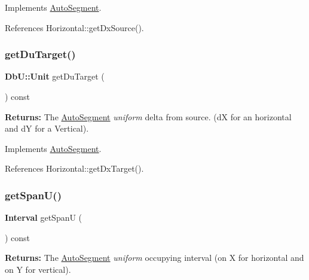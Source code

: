 Implements \mbox{\hyperlink{classKatabatic_1_1AutoSegment_ab4881df67bd8f036d0199ed6540fe774}{Auto\+Segment}}.



References Horizontal\+::get\+Dx\+Source().

\mbox{\label{classKatabatic_1_1AutoHorizontal_a76e349c14c904b3300a15caa1ee8b680}} 
\subsubsection{\texorpdfstring{get\+Du\+Target()}{getDuTarget()}}
{\footnotesize\ttfamily \textbf{ Db\+U\+::\+Unit} get\+Du\+Target (\begin{DoxyParamCaption}{ }\end{DoxyParamCaption}) const\hspace{0.3cm}{\ttfamily [virtual]}}

{\bfseries Returns\+:} The \mbox{\hyperlink{classKatabatic_1_1AutoSegment}{Auto\+Segment}} {\itshape uniform} delta from source. (dX for an horizontal and dY for a Vertical). 

Implements \mbox{\hyperlink{classKatabatic_1_1AutoSegment_a0644d656eedc71dba2fb3c6c0d83ed3f}{Auto\+Segment}}.



References Horizontal\+::get\+Dx\+Target().

\mbox{\label{classKatabatic_1_1AutoHorizontal_a0b5ac47ab175815e1a9bc07f2517614a}} 
\subsubsection{\texorpdfstring{get\+Span\+U()}{getSpanU()}}
{\footnotesize\ttfamily \textbf{ Interval} get\+SpanU (\begin{DoxyParamCaption}{ }\end{DoxyParamCaption}) const\hspace{0.3cm}{\ttfamily [virtual]}}

{\bfseries Returns\+:} The \mbox{\hyperlink{classKatabatic_1_1AutoSegment}{Auto\+Segment}} {\itshape uniform} occupying interval (on X for horizontal and on Y for vertical). 

